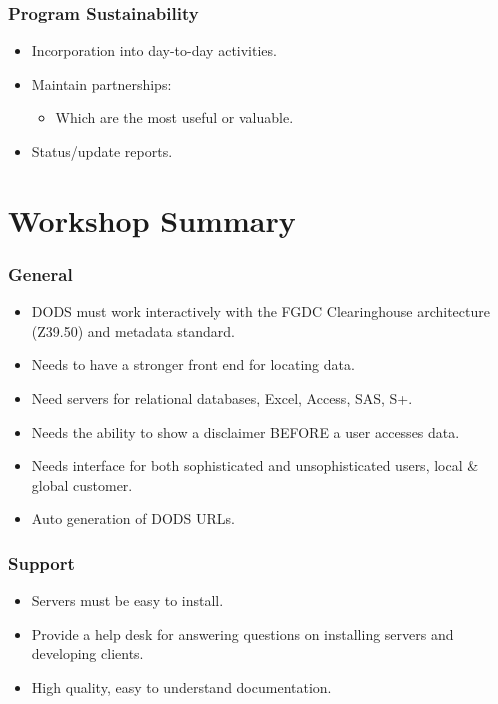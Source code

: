 \subsubsection{Program Sustainability}
\begin{itemize}
\item Incorporation into day-to-day activities.
\item Maintain partnerships:
\begin{itemize}
  \item Which are the most useful or valuable.
\end{itemize}
\item Status/update reports.
\end{itemize}


\section{Workshop Summary}

\subsubsection{General}

\begin{itemize}
\item DODS must work interactively with the FGDC Clearinghouse architecture (Z39.50) and 
metadata standard.
\item Needs to have a stronger front end for locating data.
\item Need servers for relational databases, Excel, Access, SAS, S+.
\item Needs the ability to show a disclaimer BEFORE a user accesses data.
\item Needs interface for both sophisticated and unsophisticated users, local \& global customer.
\item Auto generation of DODS URLs.
\end{itemize}

\subsubsection{Support}

\begin{itemize}
\item Servers must be easy to install.
\item Provide a help desk for answering questions on installing
  servers and developing clients.
\item High quality, easy to understand documentation.
\end{itemize}

